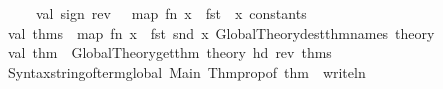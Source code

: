 \begin{isabellebody}
\isanewline
\ \ \ \ val\ sign{}\ {\isacharequal}{\kern0pt}rev\ \ {\isacharparenleft}{\kern0pt}\ map\ {\isacharparenleft}{\kern0pt}fn\ x\ {\isacharequal}{\kern0pt}{\isachargreater}{\kern0pt}\ {\isacharparenleft}{\kern0pt}fst\ \ x{\isacharparenright}{\kern0pt}{\isacharparenright}{\kern0pt}\ constants\ {\isacharparenright}{\kern0pt}\ {\isacartoucheclose}\isanewline
\isanewline
\isanewline
{}\isamarkupfalse%
\ {\isacartoucheopen}\isanewline
val\ thms\ {\isacharequal}{\kern0pt}\ map\ {\isacharparenleft}{\kern0pt}fn\ x\ {\isacharequal}{\kern0pt}{\isachargreater}{\kern0pt}\ fst\ {\isacharparenleft}{\kern0pt}snd\ x{\isacharparenright}{\kern0pt}{\isacharparenright}{\kern0pt}\ {\isacharparenleft}{\kern0pt}Global{\isacharunderscore}{\kern0pt}Theory{\isachardot}{\kern0pt}dest{\isacharunderscore}{\kern0pt}thm{\isacharunderscore}{\kern0pt}names\ {\isacharat}{\kern0pt}{\isacharbraceleft}{\kern0pt}theory{\isacharbraceright}{\kern0pt}{\isacharparenright}{\kern0pt}{\isacharsemicolon}{\kern0pt}\isanewline
val\ thm\ {\isacharequal}{\kern0pt}\ Global{\isacharunderscore}{\kern0pt}Theory{\isachardot}{\kern0pt}get{\isacharunderscore}{\kern0pt}thm\ {\isacharat}{\kern0pt}{\isacharbraceleft}{\kern0pt}theory{\isacharbraceright}{\kern0pt}\ {\isacharparenleft}{\kern0pt}hd\ {\isacharparenleft}{\kern0pt}rev\ thms{\isacharparenright}{\kern0pt}{\isacharparenright}{\kern0pt}{\isacharsemicolon}{\kern0pt}\isanewline
{\isacharparenleft}{\kern0pt}Syntax{\isachardot}{\kern0pt}string{\isacharunderscore}{\kern0pt}of{\isacharunderscore}{\kern0pt}term{\isacharunderscore}{\kern0pt}global\ \isactrltheory {\isasymopen}Main{\isasymclose}\ {\isacharparenleft}{\kern0pt}Thm{\isachardot}{\kern0pt}prop{\isacharunderscore}{\kern0pt}of\ thm{\isacharparenright}{\kern0pt}{\isacharparenright}{\kern0pt}\ {\isacharbar}{\kern0pt}{\isachargreater}{\kern0pt}\ writeln\isanewline
{\isacartoucheclose}%
\endisatagML
{\isafoldML}%
%
\isadelimML
\ \isanewline
%
\endisadelimML
%
\isadelimtheory
\isanewline
%
\endisadelimtheory
%
\isatagtheory
{}\isamarkupfalse%
%
\endisatagtheory
{\isafoldtheory}%
%
\isadelimtheory
%
\endisadelimtheory
%
\end{isabellebody}%
\endinput
